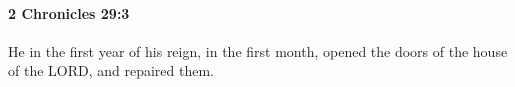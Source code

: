 
		\paragraph{2 Chronicles 29:3} %
			\label{2CHRONICLES-29-3}

			He in the first year of his reign, in the first month, opened the doors of the house of the LORD, and repaired them.


